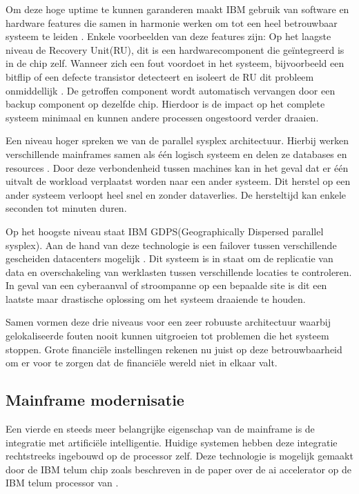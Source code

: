 Om deze hoge uptime te kunnen garanderen maakt IBM gebruik van software en hardware features die samen in harmonie werken om tot een heel betrouwbaar systeem te leiden \autocite{spruth2010}.
Enkele voorbeelden van deze features zijn:
Op het laagste niveau de Recovery Unit(RU), dit is een hardwarecomponent die geïntegreerd is in de chip zelf.
Wanneer zich een fout voordoet in het systeem, bijvoorbeeld een bitflip of een defecte transistor detecteert en isoleert de RU dit probleem onmiddellijk \autocite{lascu2022z16}.
De getroffen component wordt automatisch vervangen door een backup component op dezelfde chip.
Hierdoor is de impact op het complete systeem minimaal en kunnen andere processen ongestoord verder draaien.

Een niveau hoger spreken we van de parallel sysplex architectuur.
Hierbij werken verschillende mainframes samen als één logisch systeem en delen ze databases en resources \autocite{ebbers2012zos}.
Door deze verbondenheid tussen machines kan in het geval dat er één uitvalt de workload verplaatst worden naar een ander systeem.
Dit herstel op een ander systeem verloopt heel snel en zonder dataverlies.
De hersteltijd kan enkele seconden tot minuten duren.

Op het hoogste niveau staat IBM GDPS(Geographically Dispersed parallel sysplex).
Aan de hand van deze technologie is een failover tussen verschillende gescheiden datacenters mogelijk \autocite{raju2024gdps}.
Dit systeem is in staat om de replicatie van data en overschakeling van werklasten  tussen verschillende locaties te controleren.
In geval van een cyberaanval of stroompanne op een bepaalde site is dit een laatste maar drastische oplossing om het systeem draaiende te houden.

Samen vormen deze drie niveaus voor een zeer robuuste architectuur waarbij gelokaliseerde fouten nooit kunnen uitgroeien tot problemen die het systeem stoppen.
Grote financiële instellingen rekenen nu juist op deze betrouwbaarheid om er voor te zorgen dat de financiële wereld niet in elkaar valt.

\subsection{Mainframe modernisatie}%
\label{sec:AI-mainframe}

Een vierde en steeds meer belangrijke eigenschap van de mainframe is de integratie met artificiële intelligentie.
Huidige systemen hebben deze integratie rechtstreeks ingebouwd op de processor zelf.
Deze technologie is mogelijk gemaakt door de IBM telum chip zoals beschreven in de paper over de ai accelerator op de IBM telum processor van \cite{lichtenau2022telum}.

